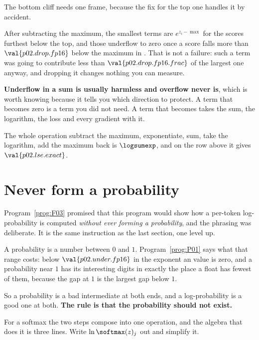 \begin{fr}
The bottom cliff needs one frame, because the fix for the top one handles it
by accident.

After subtracting the maximum, the smallest terms are $e^{z_i - \max}$ for the
scores furthest below the top, and those underflow to zero once a score falls more than
$\val{p02.drop.fp16}$ below the maximum in . That is not a failure:
such a term was going to contribute less than $\val{p02.drop.fp16.frac}$ of the
largest one anyway, and dropping it changes nothing you can measure.

\textbf{Underflow in a sum is usually harmless and overflow never is}, which is
worth knowing because it tells you which direction to protect. A term that
becomes zero is a term you did not need. A term that becomes  takes
the sum, the logarithm, the loss and every gradient with it.

The whole operation \dash{} subtract the maximum, exponentiate, sum, take the
logarithm, add the maximum back \dash{} is $\logsumexp$, and on the row above
it gives $\val{p02.lse.exact}$.
\end{fr}

\section{Never form a probability}
\label{sec:P02-logits}

\begin{fr}
Program~\ref{prog:F03} promised that this program would show how a per-token
log-probability is computed \emph{without ever forming a probability}, and the
phrasing was deliberate. It is the same instruction as the last section, one
level up.

A probability is a number between $0$ and $1$. Program~\ref{prog:P01} says what
that range costs: below $\val{p02.under.fp16}$ in the exponent an 
value is zero, and a probability near $1$ has its interesting digits in exactly
the place a float has fewest of them, because the gap at $1$ is the largest gap
below $1$.

So a probability is a bad intermediate at both ends, and a log-probability is a
good one at both. \textbf{The rule is that the probability should not exist.}

For a softmax the two steps compose into one operation, and the algebra that
does it is three lines. Write $\ln \softmax(z)_j$ out and simplify it.
\dotline
\nextframe
\end{fr}


